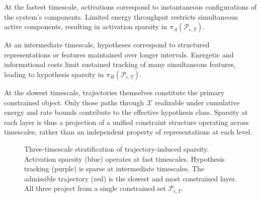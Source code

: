 \documentclass[12pt]{article}
\theoremstyle{plain}
\theoremstyle{definition}
\theoremstyle{remark}
\begin{document}
At the fastest timescale, activations correspond to instantaneous configurations of the system's components. Limited energy throughput restricts simultaneous active components, resulting in activation sparsity in $\pi_A(\mathcal{P}_{\epsilon,T})$.

At an intermediate timescale, hypotheses correspond to structured representations or features maintained over longer intervals. Energetic and informational costs limit sustained tracking of many simultaneous features, leading to hypothesis sparsity in $\pi_H(\mathcal{P}_{\epsilon,T})$.

At the slowest timescale, trajectories themselves constitute the primary constrained object. Only those paths through $\mathcal{X}$ realizable under cumulative energy and rate bounds contribute to the effective hypothesis class. Sparsity at each layer is thus a projection of a unified constraint structure operating across timescales, rather than an independent property of representations at each level.

\begin{figure}[h]
\centering
{}
\caption{Three-timescale stratification of trajectory-induced sparsity. Activation sparsity (blue) operates at fast timescales. Hypothesis tracking (purple) is sparse at intermediate timescales. The admissible trajectory (red) is the slowest and most constrained layer. All three project from a single constrained set $\mathcal{P}_{\epsilon,T}$.}
\label{fig:timescales}
\end{figure}
\end{document}
